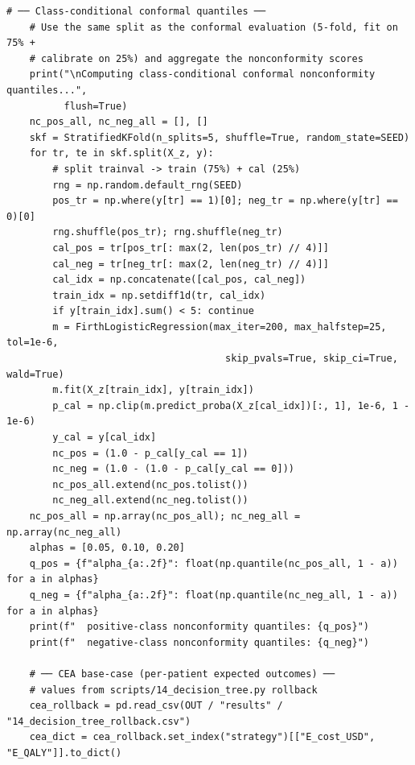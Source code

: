 \documentclass[11pt,a4paper]{article}
\begin{document}
\begin{lstlisting}[style=codeblock]
    # ── Class-conditional conformal quantiles ──
    # Use the same split as the conformal evaluation (5-fold, fit on 75% +
    # calibrate on 25%) and aggregate the nonconformity scores
    print("\nComputing class-conditional conformal nonconformity quantiles...",
          flush=True)
    nc_pos_all, nc_neg_all = [], []
    skf = StratifiedKFold(n_splits=5, shuffle=True, random_state=SEED)
    for tr, te in skf.split(X_z, y):
        # split trainval -> train (75%) + cal (25%)
        rng = np.random.default_rng(SEED)
        pos_tr = np.where(y[tr] == 1)[0]; neg_tr = np.where(y[tr] == 0)[0]
        rng.shuffle(pos_tr); rng.shuffle(neg_tr)
        cal_pos = tr[pos_tr[: max(2, len(pos_tr) // 4)]]
        cal_neg = tr[neg_tr[: max(2, len(neg_tr) // 4)]]
        cal_idx = np.concatenate([cal_pos, cal_neg])
        train_idx = np.setdiff1d(tr, cal_idx)
        if y[train_idx].sum() < 5: continue
        m = FirthLogisticRegression(max_iter=200, max_halfstep=25, tol=1e-6,
                                      skip_pvals=True, skip_ci=True, wald=True)
        m.fit(X_z[train_idx], y[train_idx])
        p_cal = np.clip(m.predict_proba(X_z[cal_idx])[:, 1], 1e-6, 1 - 1e-6)
        y_cal = y[cal_idx]
        nc_pos = (1.0 - p_cal[y_cal == 1])
        nc_neg = (1.0 - (1.0 - p_cal[y_cal == 0]))
        nc_pos_all.extend(nc_pos.tolist())
        nc_neg_all.extend(nc_neg.tolist())
    nc_pos_all = np.array(nc_pos_all); nc_neg_all = np.array(nc_neg_all)
    alphas = [0.05, 0.10, 0.20]
    q_pos = {f"alpha_{a:.2f}": float(np.quantile(nc_pos_all, 1 - a)) for a in alphas}
    q_neg = {f"alpha_{a:.2f}": float(np.quantile(nc_neg_all, 1 - a)) for a in alphas}
    print(f"  positive-class nonconformity quantiles: {q_pos}")
    print(f"  negative-class nonconformity quantiles: {q_neg}")

    # ── CEA base-case (per-patient expected outcomes) ──
    # values from scripts/14_decision_tree.py rollback
    cea_rollback = pd.read_csv(OUT / "results" / "14_decision_tree_rollback.csv")
    cea_dict = cea_rollback.set_index("strategy")[["E_cost_USD", "E_QALY"]].to_dict()


\end{lstlisting}
\end{document}
